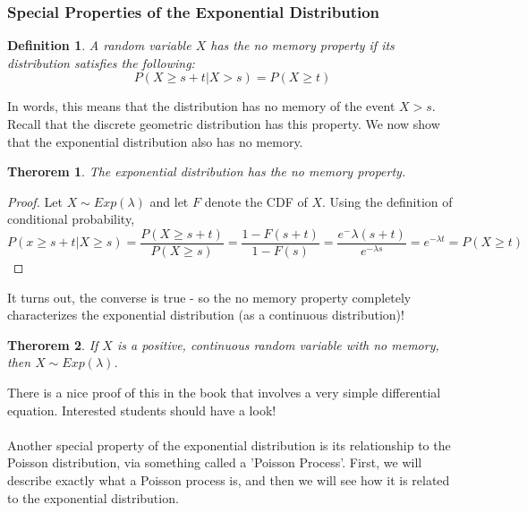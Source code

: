 \documentclass[12pt]{article} %
\newtheorem{defn}{Definition}
\newtheorem{thm}{Therorem}
\begin{document}
\subsubsection{Special Properties of the Exponential Distribution}
\begin{defn}
A random variable $X$ has the \emph{no memory} property if its distribution satisfies the  following:
$$P(X\geq s+t|X>s) = P(X\geq t)$$
\end{defn}
In words, this means that the distribution has no memory of the event $X>s$. Recall that the discrete geometric distribution has this property. We now show that the exponential distribution also has no memory.
\begin{thm}
The exponential distribution has the no memory property.
\end{thm}
\begin{proof}
Let $X \sim Exp(\lambda)$ and let $F$ denote the CDF of $X$. Using the definition of conditional probability,
$$P(x\geq s+t|X\geq s) = \frac{P(X\geq s+ t)}{P(X\geq s)} = \frac{1-F(s+t)}{1-F(s)} = \frac{e^-\lambda(s+t)}{e^{-\lambda s}} = e^{-\lambda t} = P(X\geq t)$$
\end{proof}
It turns out, the converse is true - so the no memory property completely characterizes the exponential distribution (as a continuous distribution)!
\begin{thm}
If $X$ is a positive, continuous random variable with no memory, then $X\sim Exp(\lambda)$.
\end{thm}
There is a nice proof of this in the book that involves a very simple differential equation. Interested students should have a look!\\\\
Another special property of the exponential distribution is its relationship to the Poisson distribution, via something called a 'Poisson Process'. First, we will describe exactly what a Poisson process is, and then we will see how it is related to the exponential distribution.
\end{document}

